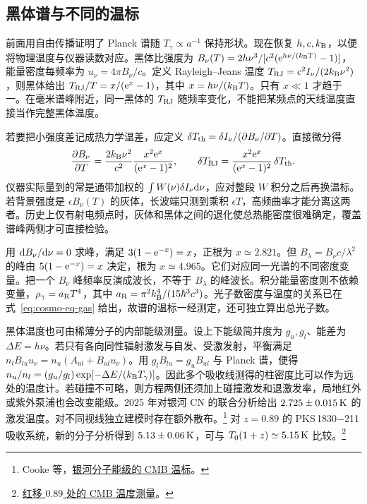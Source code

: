 \subsection{黑体谱与不同的温标}

前面用自由传播证明了 Planck 谱随 $T_\gamma\propto a^{-1}$ 保持形状。现在恢复 $h,c,k_{\rm B}$，以便将物理温度与仪器读数对应。黑体比强度为 $B_\nu(T)=2h\nu^3/[c^2(\mathrm{e}^{h\nu/(k_{\rm B}T)}-1)]$，能量密度每频率为 $u_\nu=4\pi B_\nu/c$。定义 Rayleigh--Jeans 温度 $T_{\rm RJ}=c^2I_\nu/(2k_{\rm B}\nu^2)$，则黑体给出 $T_{\rm RJ}/T=x/(\mathrm{e}^x-1)$，其中 $x=h\nu/(k_{\rm B}T)$。只有 $x\ll1$ 才趋于一。在毫米谱峰附近，同一黑体的 $T_{\rm RJ}$ 随频率变化，不能把某频点的天线温度直接当作完整黑体温度。

若要把小强度差记成热力学温差，应定义 $\delta T_{\rm th}=\delta I_\nu/(\partial B_\nu/\partial T)$。直接微分得
\[
 \frac{\partial B_\nu}{\partial T}=\frac{2k_{\rm B}\nu^2}{c^2}
     \frac{x^2\mathrm{e}^x}{(\mathrm{e}^x-1)^2},\qquad
 \delta T_{\rm RJ}=\frac{x^2\mathrm{e}^x}{(\mathrm{e}^x-1)^2}\,\delta T_{\rm th}.
\]
仪器实际量到的常是通带加权的 $\int W(\nu)\delta I_\nu\dd\nu$，应对整段 $W$ 积分之后再换温标。若背景强度是 $\epsilon B_\nu(T)$ 的灰体，长波端只测到乘积 $\epsilon T$，高频曲率才能分离这两者。历史上仅有射电频点时，灰体和黑体之间的退化使总热能密度很难确定，覆盖谱峰两侧才可直接检验。

用 $\dd B_\nu/\dd\nu=0$ 求峰，满足 $3(1-\mathrm{e}^{-x})=x$，正根为 $x\simeq2.821$。但 $B_\lambda=B_\nu c/\lambda^2$ 的峰由 $5(1-\mathrm{e}^{-x})=x$ 决定，根为 $x\simeq4.965$。它们对应同一光谱的不同密度变量。把一个 $B_\nu$ 峰频率反演成波长，不等于 $B_\lambda$ 的峰波长。积分能量密度则不依赖变量，$\rho_\gamma=a_{\rm R}T^4$，其中 $a_{\rm R}=\pi^2k_{\rm B}^4/(15\hbar^3c^3)$。光子数密度与温度的关系已在式~\eqref{eq:cosmo-eq-gas} 给出，故谱的温标一经测定，还可独立算出总光子数。

黑体温度也可由稀薄分子的内部能级测量。设上下能级简并度为 $g_u,g_l$、能差为 $\Delta E=h\nu$。若只有各向同性辐射激发与自发、受激发射，平衡满足 $n_lB_{lu}u_\nu=n_u(A_{ul}+B_{ul}u_\nu)$。用 $g_lB_{lu}=g_uB_{ul}$ 与 Planck 谱，便得 $n_u/n_l=(g_u/g_l)\exp[-\Delta E/(k_{\rm B}T_\gamma)]$。因此多个吸收线测得的柱密度比可以作为远处的温度计。若碰撞不可略，则方程两侧还须加上碰撞激发和退激发率，局地红外或紫外泵浦也会改变能级。2025 年对银河 CN 的联合分析给出 $2.725\pm0.015\,{\rm K}$ 的激发温度。对不同视线独立建模时存在额外散布。\footnote{Cooke 等，\href{https://arxiv.org/abs/2409.18270}{银河分子能级的 CMB 温标}。} 对 $z=0.89$ 的 PKS\,1830$-$211 吸收系统，新的分子分析得到 $5.13\pm0.06\,{\rm K}$，可与 $T_0(1+z)\simeq5.15\,{\rm K}$ 比较。\footnote{\href{https://doi.org/10.3847/1538-4357/ae0a1e}{红移 $0.89$ 处的 CMB 温度测量}。}

